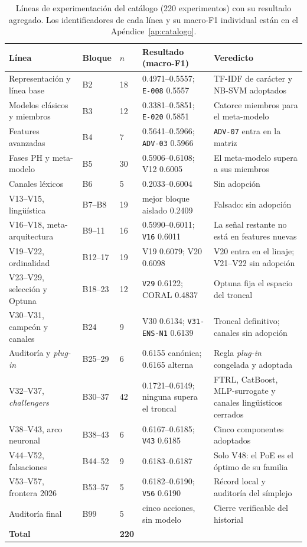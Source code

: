 \documentclass[journal]{IEEEtai}
\begin{document}
\begin{table}[htbp]
\centering
\caption{L\'ineas de experimentaci\'on del cat\'alogo (220 experimentos) con su resultado agregado. Los identificadores de cada l\'inea y su macro-F1 individual est\'an en el Ap\'endice~\ref{ap:catalogo}.}
\label{tab:lineas}
\footnotesize
\setlength{\tabcolsep}{3pt}
\begin{tabular}{p{}p{}p{}p{}p{}}
\toprule
L\'inea & Bloque & $n$ & Resultado (macro-F1) & Veredicto \\
\midrule
Representaci\'on y l\'inea base & B2 & 18 & 0.4971--0.5557; \texttt{E-008} 0.5557 & TF-IDF de car\'acter y NB-SVM adoptados \\
Modelos cl\'asicos y miembros & B3 & 12 & 0.3381--0.5851; \texttt{E-020} 0.5851 & Catorce miembros para el meta-modelo \\
Features avanzadas & B4 & 7 & 0.5641--0.5966; \texttt{ADV-03} 0.5966 & \texttt{ADV-07} entra en la matriz \\
Fases PH y meta-modelo & B5 & 30 & 0.5906--0.6108; V12 0.6005 & El meta-modelo supera a sus miembros \\
Canales l\'exicos & B6 & 5 & 0.2033--0.6004 & Sin adopci\'on \\
V13--V15, ling\"u\'istica & B7--B8 & 19 & mejor bloque aislado 0.2409 & Falsado: sin adopci\'on \\
V16--V18, meta-arquitectura & B9--11 & 16 & 0.5990--0.6011; \texttt{V16} 0.6011 & La se\~nal restante no est\'a en features nuevas \\
V19--V22, ordinalidad & B12--17 & 19 & V19 0.6079; V20 0.6098 & V20 entra en el linaje; V21--V22 sin adopci\'on \\
V23--V29, selecci\'on y Optuna & B18--23 & 12 & \texttt{V29} 0.6122; CORAL 0.4837 & Optuna fija el espacio del troncal \\
V30--V31, campe\'on y canales & B24 & 9 & V30 0.6134; \texttt{V31-ENS-N1} 0.6139 & Troncal definitivo; canales sin adopci\'on \\
Auditor\'ia y \textit{plug-in} & B25--29 & 6 & 0.6155 can\'onica; 0.6165 alterna & Regla \textit{plug-in} congelada y adoptada \\
V32--V37, \textit{challengers} & B30--37 & 42 & 0.1721--0.6149; ninguna supera el troncal & FTRL, CatBoost, MLP-surrogate y canales ling\"u\'isticos cerrados \\
V38--V43, arco neuronal & B38--43 & 6 & 0.6167--0.6185; \texttt{V43} 0.6185 & Cinco componentes adoptados \\
V44--V52, falsaciones & B44--52 & 9 & 0.6183--0.6187 & Solo V48: el PoE es el \'optimo de su familia \\
V53--V57, frontera 2026 & B53--57 & 5 & 0.6182--0.6190; \texttt{V56} 0.6190 & R\'ecord local y auditor\'ia del s\'implejo \\
Auditor\'ia final & B99 & 5 & cinco acciones, sin modelo & Cierre verificable del historial \\
\midrule
\textbf{Total} & & \textbf{220} & & \\
\bottomrule
\end{tabular}
\end{table}
\end{document}

